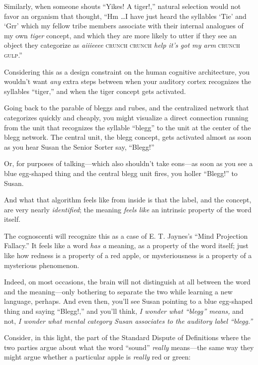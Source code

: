 {
 Similarly, when someone shouts ``Yikes! A
tiger!,'' natural selection would not favor an
organism that thought, ``Hm \ldots I have just heard
the syllables `Tie' and
`Grr' which my fellow tribe members
associate with their internal analogues of my own \textit{tiger}
concept, and which they are more likely to utter if they see an object
they categorize as \textit{aiiieeee} \textsc{crunch crunch} \textit{help
it's got my arm} \textsc{crunch gulp}.''}


{
 Considering this as a design constraint on the human cognitive
architecture, you wouldn't want \textit{any} extra
steps between when your auditory cortex recognizes the syllables
``tiger,'' and when the tiger
concept gets activated.}

{
 Going back to the parable of bleggs and rubes, and the centralized
network that categorizes quickly and cheaply, you might visualize a
direct connection running from the unit that recognizes the syllable
``blegg'' to the unit at the center
of the blegg network. The central unit, the blegg concept, gets
activated almost as soon as you hear Susan the Senior Sorter say,
``Blegg!''}

{
 Or, for purposes of talking---which also shouldn't
take eons---as soon as you see a blue egg-shaped thing and the central
blegg unit fires, you holler
``Blegg!'' to Susan.}

{
 And what that algorithm feels like from inside is that the label,
and the concept, are very nearly \textit{identified}; the meaning
\textit{feels like} an intrinsic property of the word itself.}

{
 The cognoscenti will recognize this as a case of E. T.
Jaynes's ``Mind Projection
Fallacy.'' It feels like a word \textit{has a}
meaning, as a property of the word itself; just like how redness is a
property of a red apple, or mysteriousness is a property of a
mysterious phenomenon.}

{
 Indeed, on most occasions, the brain will not distinguish at all
between the word and the meaning---only bothering to separate the two
while learning a new language, perhaps. And even then,
you'll see Susan pointing to a blue egg-shaped thing
and saying ``Blegg!,'' and
you'll think, \textit{I wonder what
``blegg'' means,} and not, \textit{I
wonder what mental category Susan associates to the auditory label
``blegg.''}}

{
 Consider, in this light, the part of the Standard Dispute of
Definitions where the two parties argue about what the word
``sound'' \textit{really}
means---the same way they might argue whether a particular apple is
\textit{really} red or green:}

